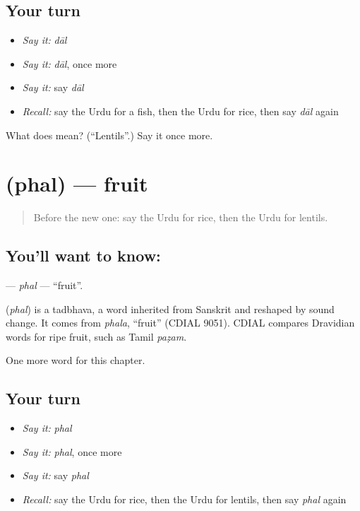 \subsection*{Your turn}
\begin{itemize}
\raggedright
  \item \emph{Say it:} \emph{dāl}
  \item \emph{Say it:} \emph{dāl}, once more
  \item \emph{Say it:} say \emph{dāl}
  \item \emph{Recall:} say the Urdu for a fish, then the Urdu for rice, then say \emph{dāl} again
\end{itemize}

\begin{tcolorbox}[breakable,colback=teal!4,colframe=teal!35!black,title={Before you move on}]
What does  mean? (\textquotedblleft{}Lentils\textquotedblright{}.) Say it once more.
\end{tcolorbox}
\section[\texorpdfstring{\ur{پھل} (phal)}{پھل (phal)}]{ (phal) — fruit}

\label{lesson:UR-C54-phal}



\begin{quote}
Before the new one: say the Urdu for rice, then the Urdu for lentils.
\end{quote}

\subsection*{You'll want to know: }
\textbf{} — \emph{phal} — \textquotedblleft{}fruit\textquotedblright{}.

\begin{cousinweb}
\textbf{} (\emph{phal}) is a tadbhava, a word inherited from Sanskrit and reshaped by sound change. It comes from \emph{phala}, \textquotedblleft{}fruit\textquotedblright{} (CDIAL 9051). CDIAL compares Dravidian words for ripe fruit, such as Tamil \emph{paẓam}.
\end{cousinweb}

\begin{grammarlens}[title={What you've built}]
One more word for this chapter.
\end{grammarlens}

\subsection*{Your turn}
\begin{itemize}
\raggedright
  \item \emph{Say it:} \emph{phal}
  \item \emph{Say it:} \emph{phal}, once more
  \item \emph{Say it:} say \emph{phal}
  \item \emph{Recall:} say the Urdu for rice, then the Urdu for lentils, then say \emph{phal} again
\end{itemize}

